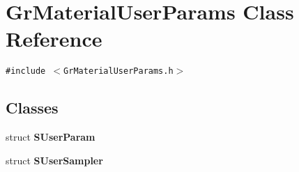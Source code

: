 \hypertarget{class_gr_material_user_params}{
\section{GrMaterialUserParams Class Reference}
\label{class_gr_material_user_params}
}
{\tt \#include $<$GrMaterialUserParams.h$>$}

\subsection*{Classes}
\begin{CompactItemize}
\item 
struct \textbf{SUserParam}
\item 
struct \textbf{SUserSampler}
\end{CompactItemize}
